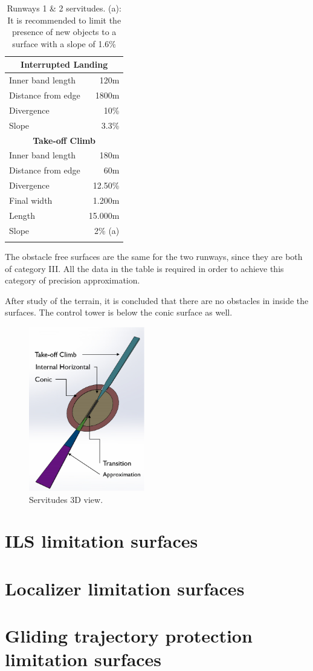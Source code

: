 \begin{longtable}[htb]{@{}lr@{}}
		\multicolumn{2}{c}{\textbf{Interrupted Landing} }\\
		\midrule[0.5pt]
		Inner band length & 120m\\
		Distance from edge & 1800m\\
		Divergence & 10\%\\
		Slope & 3.3\%\\
		\midrule[2pt]
		\multicolumn{2}{c}{\textbf{Take-off Climb} }\\
		\midrule[0.5pt]
		Inner band length & 180m\\
		Distance from edge & 60m\\
		Divergence & 12.50\%\\
		Final width & 1.200m\\
		Length & 15.000m\\
		Slope & 2\% (a)\\
		\bottomrule[3pt]
		\caption{Runways 1 \& 2 servitudes. (a): It is recommended to limit the presence of new objects to a surface with a slope of 1.6\%}
	\end{longtable}
	
	The obstacle free surfaces are the same for the two runways, since they are both of category III. All the data in the table is required in order to achieve this category of precision approximation.
	
	After study of the terrain, it is concluded that there are no obstacles in inside the surfaces. The control tower is below the conic surface as well.
	
	
	\begin{figure}[H]
		\centering
		\includegraphics[clip, trim=0cm 0cm 0cm 0cm, width=0.45\textwidth]{./images/servidumbres/3Dservidumbres}
		\caption{Servitudes 3D view.}
		\label{3Dservidumbres}
	\end{figure}

	
	\section{ILS limitation surfaces}
		\section{Localizer limitation surfaces}
		\section{Gliding trajectory protection limitation surfaces}